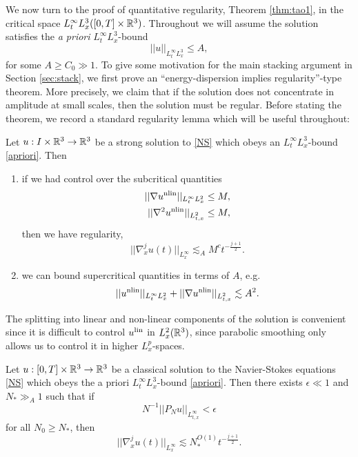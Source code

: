 We now turn to the proof of quantitative regularity, Theorem \ref{thm:tao1}, in the critical space $L^\infty_t L^3_x ([0, T] \times \mathbb R^3)$. Throughout we will assume the solution satisfies the \emph{a priori} $L^\infty_t L^3_x$-bound 
	\begin{equation}
		||u||_{L^\infty_t L^3_x} 
			\leq A, \label{eq:apriori}
	\end{equation}
for some $A \geq C_0 \gg 1$. To give some motivation for the main stacking argument in Section \ref{sec:stack}, we first prove an ``energy-dispersion implies regularity''-type theorem. More precisely, we claim that if the solution does not concentrate in amplitude at small scales, then the solution must be regular. Before stating the theorem, we record a standard regularity lemma which will be useful throughout: 

\begin{lemma}\label{lem:prelim}
	Let $u: I \times \mathbb R^3 \to \mathbb R^3$ be a strong solution to \eqref{NS} which obeys an $L^\infty_t L^3_x$-bound \eqref{apriori}. Then 
		\begin{enumerate}
			\item if we had control over the subcritical quantities
			 \begin{align*}
			||\nabla u^{\mathrm{nlin}}||_{L^\infty_t L^2_x} 
				&\leq M,\\
			||\nabla^2 u^{\mathrm{nlin}}||_{L^2_{t, x}}
				&\leq M,
		\end{align*}
	then we have regularity, 
		\[
			||\nabla^j_x u(t)||_{L^\infty_x} \lesssim_A M^{c} t^{-\frac{j + 1}{2}}.
		\]
			
			\item we can bound supercritical quantities in terms of $A$, e.g.
				\[
					||u^{\mathrm{nlin}}||_{L^\infty_t L^2_x} + ||\nabla u^{\mathrm{nlin}}||_{L^2_{t, x}} \lesssim A^2.
				\]
		\end{enumerate}
\end{lemma}

\begin{remark}
	The splitting into linear and non-linear components of the solution is convenient since it is difficult to control $u^{\mathrm{lin}}$ in $L^2_x (\mathbb R^3)$, since parabolic smoothing only allows us to control it in higher $L^p_x$-spaces. 
\end{remark}

\begin{theorem}
	Let $u: [0, T] \times \mathbb R^3 \to \mathbb R^3$ be a classical solution to the Navier-Stokes equations \eqref{NS} which obeys the a priori $L^\infty_t L^3_x$-bound \eqref{apriori}. Then there exists $\epsilon \ll 1$ and $N_* \gg_A 1$ such that if
		\[
			N^{-1} ||P_N u||_{L^\infty_{t, x}} < \epsilon
		\]
	for all $N_0 \geq N_*$, then 
		\[
			||\nabla^j_x u(t)||_{L^\infty_x} \lesssim N_*^{O(1)} t^{-\frac{j + 1}{2}}.
		\]
\end{theorem}

